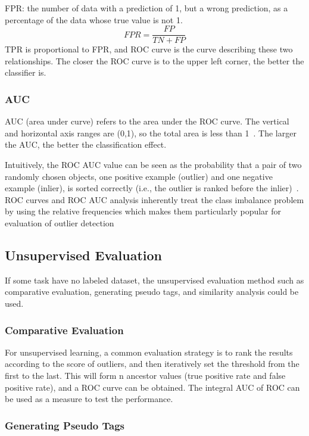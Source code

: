 FPR:
the number of data with a prediction of 1,
but a wrong prediction,
as a percentage of the data whose true value is not 1.
\begin{equation}
  FPR=\frac{FP}{TN+FP}
\end{equation}
TPR is proportional to FPR,
and ROC curve is the curve describing these two relationships.
The closer the ROC curve is to the upper left corner,
the better the classifier is.

\subsubsection{AUC}
AUC (area under curve) refers to the area under the ROC curve.
The vertical and horizontal axis ranges are (0,1),
so the total area is less than 1~\cite{bradley1997use}.
The larger the AUC,
the better the classification effect.

Intuitively, 
the ROC AUC value can be seen as the probability that a pair
of two randomly chosen objects,
one positive example (outlier) 
and one negative example (inlier),
is sorted correctly
(i.e.,
the outlier is ranked before the inlier)~\cite{hanley1982meaning}.
ROC curves
and ROC AUC analysis inherently treat the class imbalance
problem by using the relative frequencies which makes them
particularly popular for evaluation of outlier detection

\subsection{Unsupervised Evaluation}
If some task have no labeled dataset,
the unsupervised evaluation method 
such as comparative evaluation,
generating pseudo tags,
and similarity analysis could be used.

\subsubsection{Comparative Evaluation}

For unsupervised learning, 
a common evaluation strategy is to rank the 
results according to the score of outliers, 
and then iteratively set the threshold from 
the first to the last. 
This will form n ancestor values 
(true positive rate and false positive rate), 
and a ROC curve can be obtained. 
The integral AUC of ROC can be used as a measure 
to test the performance.


\subsubsection{Generating Pseudo Tags}

